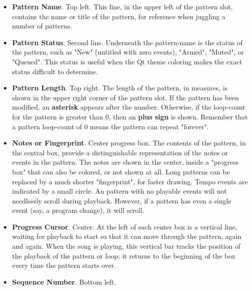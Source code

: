    \begin{itemize}
      \item \textbf{Pattern Name}. Top left.
         This line, in the upper left of the pattern slot, contains the name or
         title of the pattern, for reference when juggling a number of
         patterns.
      \item \textbf{Pattern Status}. Second line.
         Underneath the pattern-name is the status of the pattern, such as
         "New" (untitled with zero events), "Armed", "Muted", or "Queued".
         This status is useful when the Qt theme coloring makes the exact
         status difficult to determine.
      \item \textbf{Pattern Length}. Top right.
         The length of the pattern, in measures, is shown in the upper
         right corner of the pattern slot.
         If the pattern has been modified, an \textbf{asterisk}
         appears after the
         number.
         Otherwise, if the loop-count for the pattern is greater than 0, 
         then an \textbf{plus sign} is shown.
         Remember that a pattern loop-count of 0 means the pattern can repeat
         "forever".
      \item \textbf{Notes or Fingerprint}. Center progress box.
         The contents of the pattern, in the central box,
         provide a distinguishable representation of the notes or events in the
         pattern.
         The notes are shown in the center, inside a "progress box" that
         can also be colored, or not shown at all.
         Long patterns can be replaced by a much shorter "fingerprint", for
         faster drawing.
         Tempo events are indicated by a small circle.
         An pattern with no playable events will not needlessly scroll
         during playback.
         However, if a pattern has even a single event (say, a program change),
         it will scroll.
      \item \textbf{Progress Cursor}. Center.
         At the left of each center box is a vertical line, waiting for
         playback to start so that it can move through the pattern, again and
         again.
         When the song is playing, this vertical bar
         tracks the position of the playback of the pattern or loop; it
         returns to the beginning of the box every time the pattern starts
         over.
      \item \textbf{Sequence Number}. Bottom left.

\end{itemize}

